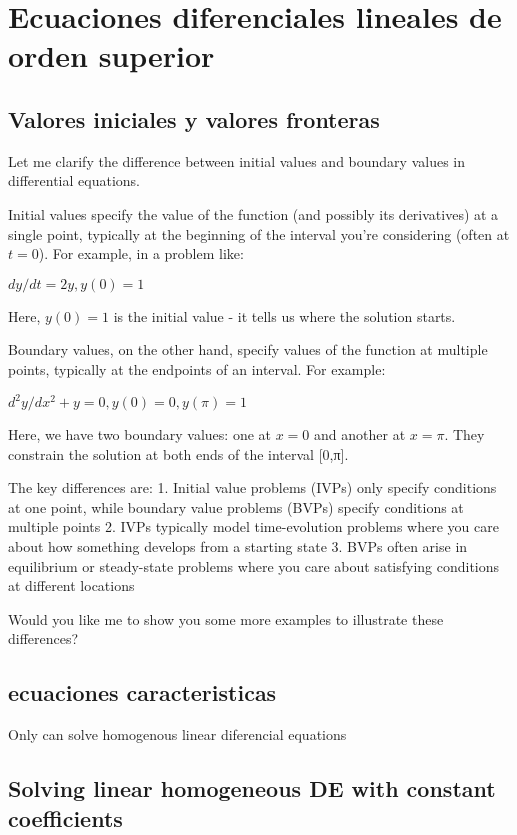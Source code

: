 \chapter{Ecuaciones diferenciales lineales de orden superior}

\section{Valores iniciales y valores fronteras}
Let me clarify the difference between initial values and boundary values in differential equations.

Initial values specify the value of the function (and possibly its derivatives) at a single point, typically at the beginning of the interval you're considering (often at $t=0$). For example, in a problem like:

$dy/dt = 2y, y(0) = 1$

Here, $y(0) = 1$ is the initial value - it tells us where the solution starts.

Boundary values, on the other hand, specify values of the function at multiple points, typically at the endpoints of an interval. For example:

$d^2y/dx^2 + y = 0, y(0) = 0, y(\pi) = 1$

Here, we have two boundary values: one at $x=0$ and another at $x=π$. They constrain the solution at both ends of the interval [0,π].

The key differences are:
1. Initial value problems (IVPs) only specify conditions at one point, while boundary value problems (BVPs) specify conditions at multiple points
2. IVPs typically model time-evolution problems where you care about how something develops from a starting state
3. BVPs often arise in equilibrium or steady-state problems where you care about satisfying conditions at different locations

Would you like me to show you some more examples to illustrate these differences?

\section{ecuaciones caracteristicas}
Only can solve homogenous linear diferencial equations

\section{Solving linear homogeneous DE with constant coefficients}

